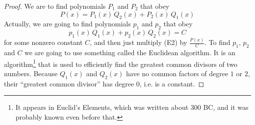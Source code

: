 \begin{proof}
We are to find polynomials $P_1$ and $P_2$ that obey
\begin{equation*}
P(x) = P_1(x)\,Q_2(x) + P_2(x)\,Q_1(x) 
\end{equation*}
Actually, we are going to find polynomials $p_1$ and $p_2$ that obey
\begin{equation*}
p_1(x)\,Q_1(x) +p_2(x)\,Q_2(x) = C
\tag{E2}\end{equation*}
for some nonzero constant $C$, and then just multiply (E2) by $\frac{P(x)}{C}$.
To find $p_1$, $p_2$ and $C$ we are going to use something called the 
Euclidean algorithm. It is an algorithm\footnote{It appears in Euclid's Elements, which was written about 300 BC, and it was probably known even before that.} that is used to efficiently find the greatest common divisors of two numbers. Because $Q_1(x)$ and $Q_2(x)$
have no common factors of degree $1$ or $2$, their ``greatest common divisor''
has degree $0$, i.e. is a constant.


\end{proof}
